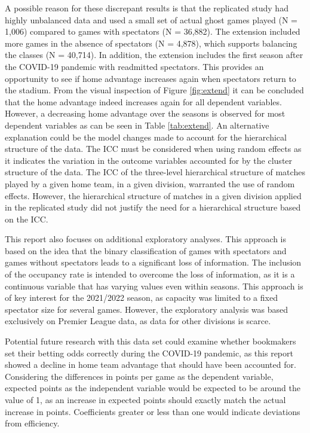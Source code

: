 A possible reason for these discrepant results is that the replicated study had highly unbalanced data and used a small set of actual ghost games played (N = 1,006) compared to games with spectators (N = 36,882). The extension included more games in the absence of spectators (N = 4,878), which supports balancing the classes (N = 40,714). 
In addition, the extension includes the first season after the COVID-19 pandemic with readmitted spectators. This provides an opportunity to see if home advantage increases again when spectators return to the stadium. From the visual inspection of Figure \ref{fig:extend} it can be concluded that the home advantage indeed increases again for all dependent variables. However, a decreasing home advantage over the seasons is observed for most dependent variables as can be seen in Table \ref{tab:extend}. An alternative explanation could be the model changes made to account for the hierarchical structure of the data. The ICC must be considered when using random effects as it indicates the variation in the outcome variables accounted for by the cluster structure of the data. The ICC of the three-level hierarchical structure of matches played by a given home team, in a given division, warranted the use of random effects. However, the hierarchical structure of matches in a given division applied in the replicated study did not justify the need for a hierarchical structure based on the ICC.

This report also focuses on additional exploratory analyses. This approach is based on the idea that the binary classification of games with spectators and games without spectators leads to a significant loss of information. The inclusion of the occupancy rate is intended to overcome the loss of information, as it is a continuous variable that has varying values even within seasons. This approach is of key interest for the 2021/2022 season, as capacity was limited to a fixed spectator size for several games. However, the exploratory analysis was based exclusively on Premier League data, as data for other divisions is scarce.

Potential future research with this data set could examine whether bookmakers set their betting odds correctly during the COVID-19 pandemic, as this report showed a decline in home team advantage that should have been accounted for. Considering the differences in points per game as the dependent variable, expected points as the independent variable would be expected to be around the value of 1, as an increase in expected points should exactly match the actual increase in points. Coefficients greater or less than one would indicate deviations from efficiency. 

